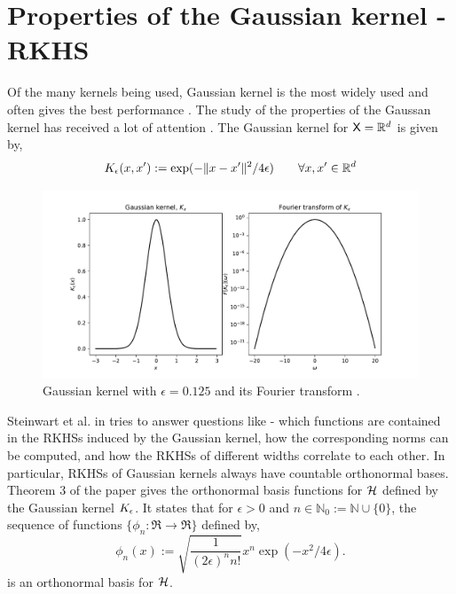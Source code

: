 \section{Properties of the Gaussian kernel -  RKHS}
\label{s:gaussian_rkhs}

Of the many kernels being used, Gaussian kernel is the most widely used and often gives the best performance \cite{min10}. The study of the properties of the Gaussan kernel has received a lot of attention \cite{stehussco06, min10,micchaxuzha06}. The Gaussian kernel for ${\sf X} = \mathbb{R}^d$ is given by,
\begin{equation}
K_{\epsilon}(x,x') := \exp(-\|x - x'\|^2/ 4\epsilon) \qquad \forall x,x' \in \mathbb{R}^d
\end{equation}

\begin{figure}[htbp]
	\centering
	\includegraphics[width=6in]{images/Chap3_Gaussian_kernel}
	\caption{Gaussian kernel with $\epsilon = 0.125$ and its Fourier transform \cite{schsmo01}.}
	\label{fig:gaussian_kernel}
\end{figure}

Steinwart et al. in \cite{stehussco06} tries to answer questions like - which functions are contained in the RKHSs induced by the Gaussian kernel, how the corresponding norms can be computed, and how the RKHSs of different widths correlate to each other. 
In particular, RKHSs of Gaussian kernels always have countable orthonormal bases. Theorem 3 of the paper gives the orthonormal basis functions for ${\cal H}$ defined by the Gaussian kernel $K_\epsilon$. It states that for $\epsilon >0$ and $n \in \mathbb{N}_0 := \mathbb{N} \cup \{0\}$, the sequence of functions $\{\phi_n : \Re \to \Re\}$ defined by,
\begin{equation}
\phi_n(x) := \sqrt{\frac{1}{(2\epsilon)^n n!}}x^n \exp(-x^2/4\epsilon).
\end{equation}
is an orthonormal basis for ${\cal H}$.

